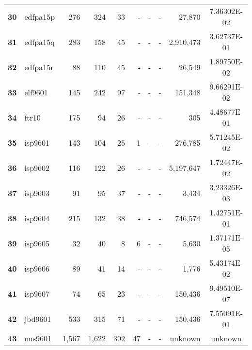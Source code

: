 \begin{longtable}{@{}llrrrrrrrc@{}}
\textbf{30} & edfpa15p & 276                  & 324      & 33      & -    & -    & -     & 27,870               & 7.36302E-02 \\
\textbf{31} & edfpa15q & 283                  & 158      & 45      & -    & -    & -     & 2,910,473            & 3.62737E-01 \\
\textbf{32} & edfpa15r & 88                   & 110      & 45      & -    & -    & -     & 26,549               & 1.89750E-02 \\
\textbf{33} & elf9601  & 145                  & 242      & 97      & -    & -    & -     & 151,348              & 9.66291E-02 \\
\textbf{34} & ftr10    & 175                  & 94       & 26      & -    & -    & -     & 305                  & 4.48677E-01 \\
\textbf{35} & isp9601  & 143                  & 104      & 25      & 1    & -    & -     & 276,785              & 5.71245E-02 \\
\textbf{36} & isp9602  & 116                  & 122      & 26      & -    & -    & -     & 5,197,647            & 1.72447E-02 \\
\textbf{37} & isp9603  & 91                   & 95       & 37      & -    & -    & -     & 3,434                & 3.23326E-03 \\
\textbf{38} & isp9604  & 215                  & 132      & 38      & -    & -    & -     & 746,574              & 1.42751E-01 \\
\textbf{39} & isp9605  & 32                   & 40       & 8       & 6    & -    & -     & 5,630                & 1.37171E-05 \\
\textbf{40} & isp9606  & 89                   & 41       & 14      & -    & -    & -     & 1,776                & 5.43174E-02 \\
\textbf{41} & isp9607  & 74                   & 65       & 23      & -    & -    & -     & 150,436              & 9.49510E-07 \\
\textbf{42} & jbd9601  & 533                  & 315      & 71      & -    & -    & -     & 150,436              & 7.55091E-01 \\
\textbf{43} & nus9601  & 1,567                & 1,622    & 392     & 47   & -    & -     & unknown              & unknown     \\* \bottomrule
\end{longtable}